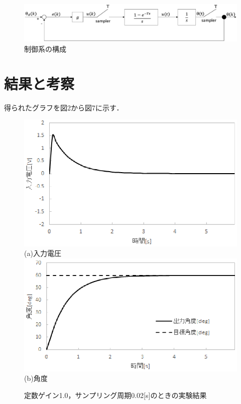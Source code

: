 \documentclass[11pt,a4paper]{jsarticle}
\begin{document}
\begin{figure}[b]
 \begin{center}
  \includegraphics[scale=.6]{./picture/5-blocks2.eps} 
  \caption{制御系の構成}
  \label{fig1}
 \end{center}
\end{figure}

\setcounter{section}{3}

\section{結果と考察}
得られたグラフを図2から図7に示す．
\begin{figure}[b]
 \begin{center}
  \includegraphics[scale=.6]{./picture/regraph1.eps} \\
  (a)入力電圧 \\
  \includegraphics[scale=.6]{./picture/regraph2.eps} \\
  (b)角度
  \caption{定数ゲイン1.0，サンプリング周期0.02[s]のときの実験結果}
 \end{center}
\end{figure}
\end{document}
